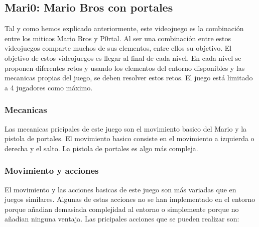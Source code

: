 \subsection{Mari0: Mario Bros con portales}

Tal y como hemos explicado anteriormente, este videojuego es la combinación entre los miticos Mario Bros y P0rtal. Al ser una combinación entre estos videojuegos comparte muchos de sus elementos, entre ellos su objetivo. El objetivo de estos videojuegos es llegar al final de cada nivel. En cada nivel se proponen diferentes retos y usando los elementos del entorno disponibles y las mecanicas propias del juego, se deben resolver estos retos. El juego está limitado a 4 jugadores como máximo.

\subsubsection{Mecanicas}

Las mecanicas pricipales de este juego son el movimiento basico del Mario y la pistola de portales. El movimiento basico consiste en el movimiento a izquierda o derecha y el salto. La pistola de portales es algo más compleja. 

\subsubsection*{Movimiento y acciones}

El movimiento y las acciones basicas de este juego son más variadas que en juegos similares. Algunas de estas acciones no se han implementado en el entorno porque añadian demasiada complejidad al entorno o simplemente porque no añadian ninguna ventaja. Las pricipales acciones que se pueden realizar son:

